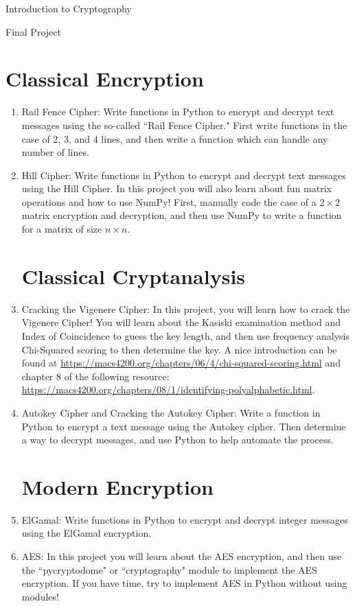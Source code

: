 \documentclass[12pt]{amsart}
\theoremstyle{definition}
\theoremstyle{remark}
\numberwithin{equation}{section}
\begin{document}
\begin{center}
Introduction to Cryptography

Final Project
\end{center}

\section{Classical Encryption}
\begin{enumerate}
\item Rail Fence Cipher: Write functions in Python to encrypt and decrypt text messages using the so-called ``Rail Fence Cipher." First write functions in the case of 2, 3, and 4 lines, and then write a function which can handle any number of lines.
\vspace{10pt}
\item Hill Cipher: Write functions in Python to encrypt and decrypt text messages using the Hill Cipher. In this project you will also learn about fun matrix operations and how to use NumPy! First, manually code the case of a $2\times 2$ matrix encryption and decryption, and then use NumPy to write a function for a matrix of size $n\times n$.

\section{Classical Cryptanalysis}
\item Cracking the Vigenere Cipher: In this project, you will learn how to crack the Vigenere Cipher! You will learn about the Kasiski examination method and Index of Coincidence to guess the key length, and then use frequency analysis Chi-Squared scoring to then determine the key. A nice introduction can be found at \url{https://macs4200.org/chapters/06/4/chi-squared-scoring.html} and chapter 8 of the following resource: \url{https://macs4200.org/chapters/08/1/identifying-polyalphabetic.html}.
\vspace{10pt}
\item Autokey Cipher and Cracking the Autokey Cipher: Write a function in Python to encrypt a text message using the Autokey cipher. Then determine a way to decrypt messages, and use Python to help automate the process.
\section{Modern Encryption}
\item ElGamal: Write functions in Python to encrypt and decrypt integer messages using the ElGamal encryption. 
\item AES: In this project you will learn about the AES encryption, and then use the ``pycryptodome" or ``cryptography" module to implement the AES encryption. If you have time, try to implement AES in Python without using modules!

\end{enumerate}
\end{document}
